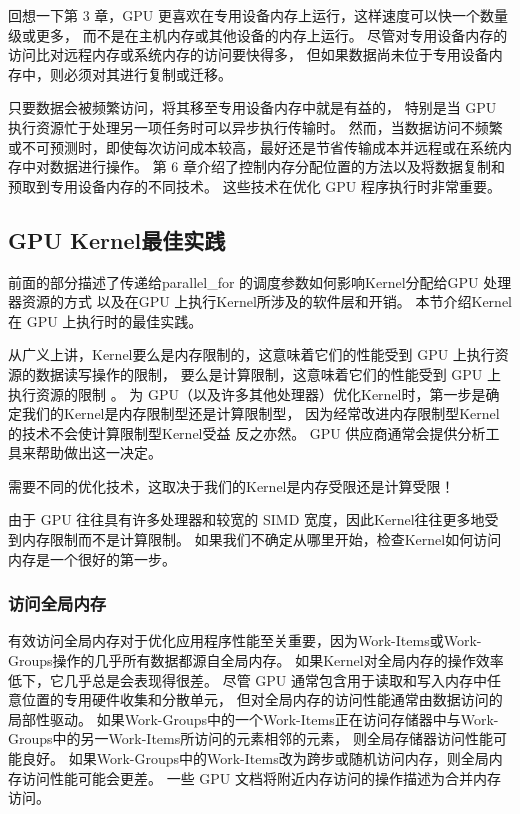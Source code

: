 回想一下第 3 章，GPU 更喜欢在专用设备内存上运行，这样速度可以快一个数量级或更多，
而不是在主机内存或其他设备的内存上运行。 
尽管对专用设备内存的访问比对远程内存或系统内存的访问要快得多，
但如果数据尚未位于专用设备内存中，则必须对其进行复制或迁移。

只要数据会被频繁访问，将其移至专用设备内存中就是有益的，
特别是当 GPU 执行资源忙于处理另一项任务时可以异步执行传输时。 
然而，当数据访问不频繁或不可预测时，即使每次访问成本较高，最好还是节省传输成本并远程或在系统内存中对数据进行操作。 
第 6 章介绍了控制内存分配位置的方法以及将数据复制和预取到专用设备内存的不同技术。 
这些技术在优化 GPU 程序执行时非常重要。

\subsection{GPU Kernel最佳实践}
前面的部分描述了传递给parallel\_for 的调度参数如何影响Kernel分配给GPU 处理器资源的方式
以及在GPU 上执行Kernel所涉及的软件层和开销。 本节介绍Kernel在 GPU 上执行时的最佳实践。

从广义上讲，Kernel要么是内存限制的，这意味着它们的性能受到 GPU 上执行资源的数据读写操作的限制，
要么是计算限制，这意味着它们的性能受到 GPU 上执行资源的限制 。 
为 GPU（以及许多其他处理器）优化Kernel时，第一步是确定我们的Kernel是内存限制型还是计算限制型，
因为经常改进内存限制型Kernel的技术不会使计算限制型Kernel受益 反之亦然。 
GPU 供应商通常会提供分析工具来帮助做出这一决定。

\begin{remark}
	需要不同的优化技术，这取决于我们的Kernel是内存受限还是计算受限！
\end{remark}

由于 GPU 往往具有许多处理器和较宽的 SIMD 宽度，因此Kernel往往更多地受到内存限制而不是计算限制。 
如果我们不确定从哪里开始，检查Kernel如何访问内存是一个很好的第一步。

\subsubsection{访问全局内存}
有效访问全局内存对于优化应用程序性能至关重要，因为Work-Items或Work-Groups操作的几乎所有数据都源自全局内存。 
如果Kernel对全局内存的操作效率低下，它几乎总是会表现得很差。 
尽管 GPU 通常包含用于读取和写入内存中任意位置的专用硬件收集和分散单元，
但对全局内存的访问性能通常由数据访问的局部性驱动。 
如果Work-Groups中的一个Work-Items正在访问存储器中与Work-Groups中的另一Work-Items所访问的元素相邻的元素，
则全局存储器访问性能可能良好。 
如果Work-Groups中的Work-Items改为跨步或随机访问内存，则全局内存访问性能可能会更差。 
一些 GPU 文档将附近内存访问的操作描述为合并内存访问。

